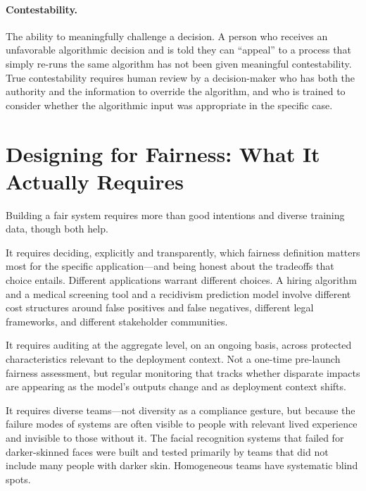 \paragraph{Contestability.} The ability to meaningfully challenge a decision. A person who receives an unfavorable algorithmic decision and is told they can ``appeal'' to a process that simply re-runs the same algorithm has not been given meaningful contestability. True contestability requires human review by a decision-maker who has both the authority and the information to override the algorithm, and who is trained to consider whether the algorithmic input was appropriate in the specific case.

\section{Designing for Fairness: What It Actually Requires}
\label{sec:ch14-designing-fairness}

Building a fair \hitl system requires more than good intentions and diverse training data, though both help.

It requires deciding, explicitly and transparently, which fairness definition matters most for the specific application---and being honest about the tradeoffs that choice entails. Different applications warrant different choices. A hiring algorithm and a medical screening tool and a recidivism prediction model involve different cost structures around false positives and false negatives, different legal frameworks, and different stakeholder communities.

It requires auditing at the aggregate level, on an ongoing basis, across protected characteristics relevant to the deployment context. Not a one-time pre-launch fairness assessment, but regular monitoring that tracks whether disparate impacts are appearing as the model's outputs change and as deployment context shifts.

It requires diverse teams---not diversity as a compliance gesture, but because the failure modes of \ai systems are often visible to people with relevant lived experience and invisible to those without it. The facial recognition systems that failed for darker-skinned faces were built and tested primarily by teams that did not include many people with darker skin. Homogeneous teams have systematic blind spots.

